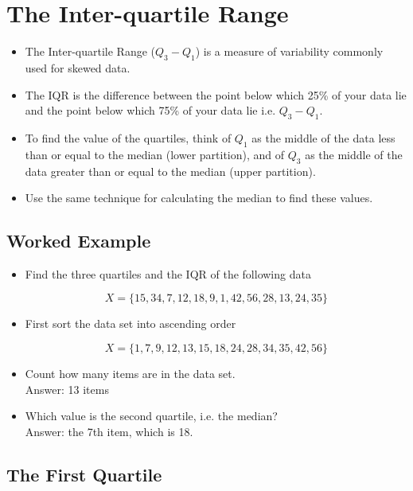 \documentclass[a4paper,12pt]{article}
\begin{document}
\section*{The Inter-quartile Range}

\begin{itemize}
    \item The Inter-quartile Range ($Q_3  - Q_1$) is a  measure of variability commonly used for skewed data.
\item The IQR is the difference between the point below which 25\% of your data lie and the point below which 75\% of your data lie i.e. $Q_3  - Q_1$. 
\item To find the value of the quartiles, think of $Q_1$ as the middle of the data less than or equal to the median (lower partition), and of $Q_3$ as the middle of the data greater than or equal to the median (upper partition).
\item Use the same technique for calculating the median to find these values.
\end{itemize}


\subsection*{Worked Example}



\begin{itemize}
\item Find the three quartiles and the IQR of the following data

\[ X = \{15,  34,  7,  12,  18,  9,  1,  42,  56,  28,  13,  24,  35\}  \]

\item First sort the data set into ascending order

\[X = \{1, 7,  9, 12, 13, 15, 18,  24, 28, 34, 35, 42, 56\}\]


\item Count how many items are in the data set.\\ Answer: 13 items

\item Which value is the second quartile, i.e. the median? \\ Answer: the 7th item, which is 18.
\end{itemize}



\subsection*{The First Quartile}
\end{document}
